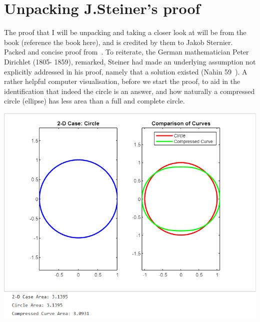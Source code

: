 \documentclass[a4paper]{book}
\begin{document}
\section{Unpacking J.Steiner's proof}
The proof that I will be unpacking and taking a closer look at will be from the book (reference the book here), and is credited by them to Jakob Sternier. Packed and concise proof from~\cite{gluck2012isoperimetric}. To reiterate, the German mathematician Peter Dirichlet (1805- 1859), remarked, Steiner had made an underlying assumption not explicitly addressed in his proof, namely that a solution existed (Nahin 59~\cite{nahin2021least}). A rather helpful computer visualisation, before we start the proof, to aid in the identification that indeed the circle is an answer, and how naturally a compressed circle (ellipse) has less area than a full and complete circle.
\begin{minipage}{\linewidth}
    \centering
    \includegraphics[width=150mm]{steinerproofvisualisation.png}
\end{minipage}
\end{document}
